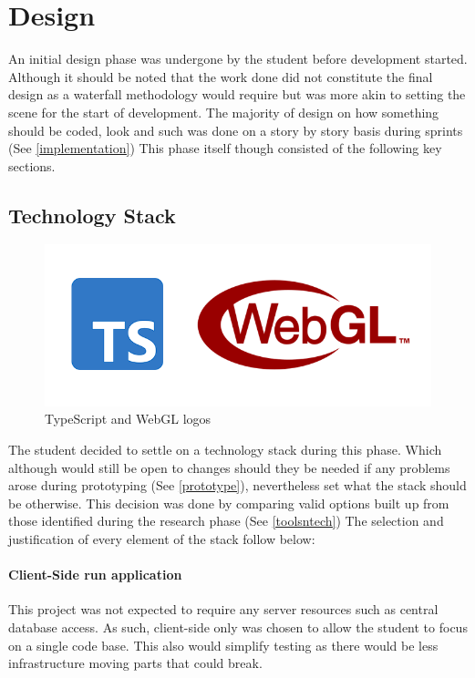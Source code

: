 \section{Design}
An initial design phase was undergone by the student before development started. Although it should be noted that the work done did not constitute the final design as a waterfall methodology would require but was more akin to setting the scene for the start of development. The majority of design on how something should be coded, look and such was done on a story by story basis during sprints (See \ref{implementation})
This phase itself though consisted of the following key sections.

\subsection{Technology Stack} \label{techstack}
\begin{figure}[h]
    \centering
    \includegraphics[width=1\columnwidth]{author-files/figures/logo-ts-webgl.PNG}
    \caption{TypeScript \cite[]{microsoft_2020_typescript} and WebGL logos \cite[]{khronosgroup_2017_the}}
    \label{fig:tswebgllogo}
\end{figure}
The student decided to settle on a technology stack during this phase. Which although would still be open to changes should they be needed if any problems arose during prototyping (See \ref{prototype}), nevertheless set what the stack should be otherwise. This decision was done by comparing valid options built up from those identified during the research phase (See \ref{toolsntech}) The selection and justification of every element of the stack follow below:

\paragraph{Client-Side run application}
This project was not expected to require any server resources such as central database access. As such, client-side only was chosen to allow the student to focus on a single code base. This also would simplify testing as there would be less infrastructure moving parts that could break.

